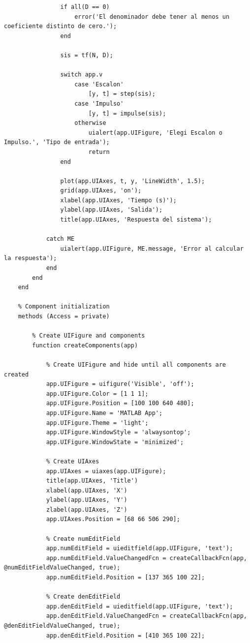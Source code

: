 \begin{lstlisting}
                if all(D == 0)
                    error('El denominador debe tener al menos un coeficiente distinto de cero.');
                end

                sis = tf(N, D);

                switch app.v
                    case 'Escalon'
                        [y, t] = step(sis);
                    case 'Impulso'
                        [y, t] = impulse(sis);
                    otherwise
                        uialert(app.UIFigure, 'Elegi Escalon o Impulso.', 'Tipo de entrada');
                        return
                end

                plot(app.UIAxes, t, y, 'LineWidth', 1.5);
                grid(app.UIAxes, 'on');
                xlabel(app.UIAxes, 'Tiempo (s)');
                ylabel(app.UIAxes, 'Salida');
                title(app.UIAxes, 'Respuesta del sistema');

            catch ME
                uialert(app.UIFigure, ME.message, 'Error al calcular la respuesta');
            end
        end
    end

    % Component initialization
    methods (Access = private)

        % Create UIFigure and components
        function createComponents(app)

            % Create UIFigure and hide until all components are created
            app.UIFigure = uifigure('Visible', 'off');
            app.UIFigure.Color = [1 1 1];
            app.UIFigure.Position = [100 100 640 480];
            app.UIFigure.Name = 'MATLAB App';
            app.UIFigure.Theme = 'light';
            app.UIFigure.WindowStyle = 'alwaysontop';
            app.UIFigure.WindowState = 'minimized';

            % Create UIAxes
            app.UIAxes = uiaxes(app.UIFigure);
            title(app.UIAxes, 'Title')
            xlabel(app.UIAxes, 'X')
            ylabel(app.UIAxes, 'Y')
            zlabel(app.UIAxes, 'Z')
            app.UIAxes.Position = [68 66 506 290];

            % Create numEditField
            app.numEditField = uieditfield(app.UIFigure, 'text');
            app.numEditField.ValueChangedFcn = createCallbackFcn(app, @numEditFieldValueChanged, true);
            app.numEditField.Position = [137 365 100 22];

            % Create denEditField
            app.denEditField = uieditfield(app.UIFigure, 'text');
            app.denEditField.ValueChangedFcn = createCallbackFcn(app, @denEditFieldValueChanged, true);
            app.denEditField.Position = [410 365 100 22];


\end{lstlisting}
